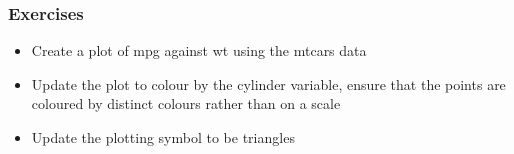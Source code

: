 \documentclass[MASTER.tex]{subfiles}
\begin{document}
\begin{frame}
	\frametitle{Exercises}
	\Large
	\begin{itemize}
		\item Create a plot of mpg against wt using the mtcars
		data
		\item Update the plot to colour by the cylinder variable,
		ensure that the points are coloured by distinct
		colours rather than on a scale
		\item Update the plotting symbol to be triangles
		
	\end{itemize}
\end{frame}
\end{document}

